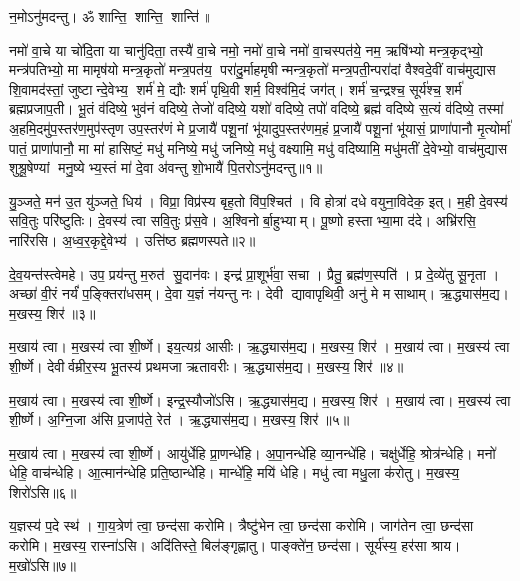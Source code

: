 \setcounter{anuvakam}{0}
न॒मोऽनु॑मदन्तु। ॐ शान्ति॒ शान्ति॒ शान्ति॑॥ 

नमो॑ वा॒चे या चो॑दि॒ता या चानु॑दिता॒ तस्यै॑ वा॒चे नमो॒ नमो॑ वा॒चे नमो॑ वा॒चस्पत॑ये॒ नम॒ ऋषि॑भ्यो मन्त्र॒कृद्भ्यो॒ मन्त्र॑पतिभ्यो॒ मा मामृष॑यो मन्त्र॒कृतो॑ मन्त्र॒पत॑य॒ परा॑दु॒र्माहमृषीन्मन्त्र॒कृतो॑ मन्त्र॒पती॒न्परा॑दां वैश्वदे॒वीं वाच॑मुद्यास शि॒वामद॑स्तां॒ जुष्टान्दे॒वेभ्य॒ शर्म॑ मे॒ द्यौः  शर्म॑ पृथि॒वी शर्म॒ विश्व॑मि॒दं जग॑त्। शर्म॑ च॒न्द्रश्च॒ सूर्य॑श्च॒ शर्म॑ ब्रह्मप्रजाप॒ती। भू॒तं व॑दिष्ये॒ भुव॑नं वदिष्ये॒ तेजो॑ वदिष्ये॒ यशो॑ वदिष्ये॒ तपो॑ वदिष्ये॒ ब्रह्म॑ वदिष्ये स॒त्यं व॑दिष्ये॒ तस्मा॑ अ॒हमि॒दमु॑प॒स्तर॑ण॒मुप॑स्तृण उप॒स्तर॑णं मे प्र॒जायै॑ पशू॒नां भू॑यादुप॒स्तर॑णम॒हं प्र॒जायै॑ पशू॒नां भू॑यासं॒ प्राणा॑पानौ मृ॒त्योर्मा॑ पातं॒ प्राणा॑पानौ॒ मा मा॑ हासिष्टं॒ मधु॑ मनिष्ये॒ मधु॑ जनिष्ये॒ मधु॑ वक्ष्यामि॒ मधु॑ वदिष्यामि॒ मधु॑मतीं दे॒वेभ्यो॒ वाच॑मुद्यास शुश्रू॒षेण्यां मनु॒ष्येभ्य॒स्तं मा॑ दे॒वा अ॑वन्तु शो॒भायै॑ पि॒तरोऽनु॑मदन्तु॥१॥
\anuvakamend

यु॒ञ्जते॒ मन॑ उ॒त यु॑ञ्जते॒ धिय॑। विप्रा॒ विप्र॑स्य बृह॒तो वि॑प॒श्चित॑। वि होत्रा॑ दधे वयुना॒विदेक॒ इत्। म॒ही दे॒वस्य॑ सवि॒तुः परि॑ष्टुतिः। दे॒वस्य॑ त्वा सवि॒तुः प्र॑स॒वे। अ॒श्विनोर्बा॒हुभ्याम्। पू॒ष्णो हस्ताभ्या॒मा द॑दे। अभ्रि॑रसि॒ नारि॑रसि। अ॒ध्व॒र॒कृद्दे॒वेभ्य॑। उत्ति॑ष्ठ ब्रह्मणस्पते॥२॥

दे॒व॒यन्त॑स्त्वेमहे। उप॒ प्रय॑न्तु म॒रुत॑ सु॒दान॑वः। इन्द्र॑ प्रा॒शूर्भ॑वा॒ सचा। प्रैतु॒ ब्रह्म॑ण॒स्पति॑। प्र दे॒व्ये॑तु सू॒नृता। अच्छा॑ वी॒रं नर्यं॑ प॒ङ्क्तिरा॑धसम्। दे॒वा य॒ज्ञं न॑यन्तु नः। देवी द्यावापृथिवी॒ अनु॑ मे मसाथाम्। ऋ॒द्ध्यास॑म॒द्य। म॒खस्य॒ शिर॑॥३॥

म॒खाय॑ त्वा। म॒खस्य॑ त्वा शी॒र्ष्णे। इय॒त्यग्र॑ आसीः। ऋ॒द्ध्यास॑म॒द्य। म॒खस्य॒ शिर॑। म॒खाय॑ त्वा। म॒खस्य॑ त्वा शी॒र्ष्णे। देवीर्वम्रीर॒स्य भू॒तस्य॑ प्रथमजा ऋतावरीः। ऋ॒द्ध्यास॑म॒द्य। म॒खस्य॒ शिर॑॥४॥

म॒खाय॑ त्वा। म॒खस्य॑ त्वा शी॒र्ष्णे। इन्द्र॒स्यौजो॑ऽसि। ऋ॒द्ध्यास॑म॒द्य। म॒खस्य॒ शिर॑। म॒खाय॑ त्वा। म॒खस्य॑ त्वा शी॒र्ष्णे। अ॒ग्नि॒जा अ॑सि प्र॒जाप॑ते॒ रेत॑। ऋ॒द्ध्यास॑म॒द्य। म॒खस्य॒ शिर॑॥५॥

म॒खाय॑ त्वा। म॒खस्य॑ त्वा शी॒र्ष्णे। आयु॑र्धेहि प्रा॒णन्धे॑हि। अ॒पा॒नन्धे॑हि व्या॒नन्धे॑हि। चक्षु॑र्धेहि॒ श्रोत्र॑न्धेहि। मनो॑ धेहि॒ वाच॑न्धेहि। आ॒त्मान॑न्धेहि प्रति॒ष्ठान्धे॑हि। मान्धे॑हि॒ मयि॑ धेहि। मधु॑ त्वा मधु॒ला क॑रोतु। म॒खस्य॒ शिरो॑ऽसि॥६॥

य॒ज्ञस्य॑ प॒दे स्थ॑। गा॒य॒त्रेण॑ त्वा॒ छन्द॑सा करोमि। त्रैष्टु॑भेन त्वा॒ छन्द॑सा करोमि। जाग॑तेन त्वा॒ छन्द॑सा करोमि। म॒खस्य॒ रास्ना॑ऽसि। अदि॑तिस्ते॒ बिल॑ङ्गृह्णातु। पाङ्क्ते॑न॒ छन्द॑सा। सूर्य॑स्य॒ हर॑सा श्राय। म॒खो॑ऽसि॥७॥
\anuvakamend[प॒ते॒ शिर॑ ऋतावरीर्\mbox{}ऋ॒द्ध्यास॑म॒द्य म॒खस्य॒ शिर॒ शिर॒ शिरो॑ऽसि॒ नव॑ च%
]

